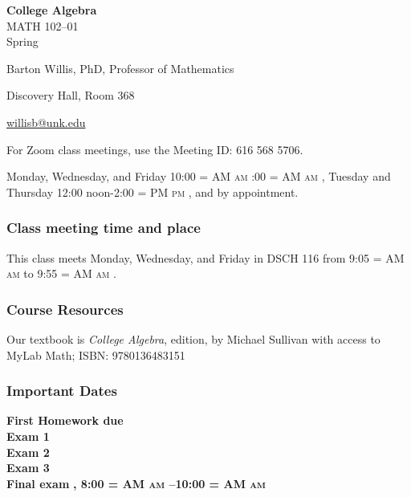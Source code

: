 \documentclass[12pt]{article}
\makeatletter
\newcounter{on}\setcounter{on}{0}
\newcounter{ex}\setcounter{ex}{0}
\newenvironment{mypar}[2]
  {\begin{list}{}%
    {\setlength\leftmargin{#1}
    \setlength\rightmargin{#2}}
    \item[]}
  {\end{list}}
\renewenvironment{description}[0]{\begin{compactdesc}}{\end{compactdesc}}
\DeclareRobustCommand{\maybefakesc}[1]{%
  \ifnum\pdfstrcmp{\f@series}{\bfdefault}=\z@
    {\fontsize{\dimexpr0.8\dimexpr\f@size pt\relax}{0}\selectfont\uppercase{#1}}%
  \else
    \textsc{#1}%
  \fi
}
\newcommand\AM{\maybefakesc{am}\xspace}
\newcommand\PM{\maybefakesc{pm}\xspace}
\newcommand{\coursename}{College Algebra}
\newcommand{\coursenumber}{MATH 102}
\newcommand{\sectionnumber}{01}
\newcommand{\term}{Spring }
\newcommand{\room}{DSCH 116}
\newcommand{\meetingtime}{This class meets Monday, Wednesday, and Friday in \room \/  from 9:05 \AM to 9:55 \AM.}
\newcommand{\officehours}{Monday, Wednesday, and Friday 10:00\AM-11:00\AM,
    Tuesday and Thursday 12:00 noon-2:00\PM, and by appointment.}
\makeatother
\begin{document}
\cleanlookdateon%
\shortdate
\printyearoff
\large
\begin{center}
    \textbf{\coursename}  \\
    {\coursenumber--\sectionnumber} \\
     {\term \the\year} \\
\end{center}

\vskip0.25in
\normalsize


\begin{center}
\begin{description}
    \item[Instructor:] Barton Willis, PhD, Professor of Mathematics
    \item[Office:]  Discovery Hall, Room 368
    \item[\phone:]   
    \item[\Email:]    \href{mailto:willisb@unk.edu}{willisb@unk.edu}
    \item[Zoom for classes:] For Zoom class meetings, use the Meeting ID: 616 568 5706. 
    \item[Office Hours:] \officehours
  \end{description}
\end{center}

\subsubsection*{Class meeting time and place}

\meetingtime



\subsubsection*{Course Resources}

\noindent Our textbook is \emph{College Algebra},  edition, by Michael 
Sullivan with access to MyLab Math; ISBN: 9780136483151


\subsubsection*{Important Dates}

\begin{mypar}{0.25in}{0.25in} 

    \textbf{First Homework due} \dotfill  \textbf{}  \\
    \textbf{Exam 1} \dotfill \textbf{}  \\
    \textbf{Exam 2} \dotfill  \textbf{} \\
    \textbf{Exam 3} \dotfill \textbf{} \\
    \textbf{Final exam} \dotfill  \textbf{, 8:00 \AM--10:00 \AM}
\end{mypar}
\end{document}
